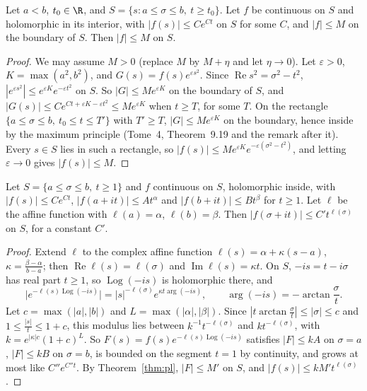 \begin{theorem}\label{thm:pl}
Let $a<b$, $t_0\in\R$, and $S=\{s:a\le\sigma\le b,\ t\ge t_0\}$. Let $f$ be continuous on $S$ and holomorphic in its interior, with $|f(s)|\le Ce^{Ct}$ on $S$ for some $C$, and $|f|\le M$ on the boundary of $S$.
Then $|f|\le M$ on $S$.
\end{theorem}
\begin{proof}
We may assume $M>0$ (replace $M$ by $M+\eta$ and let $\eta\to0$). Let $\varepsilon>0$, $K=\max(a^2,b^2)$, and $G(s)=f(s)e^{\varepsilon s^2}$. Since $\operatorname{Re}s^2=\sigma^2-t^2$, $|e^{\varepsilon s^2}|\le e^{\varepsilon K}e^{-\varepsilon t^2}$ on $S$. So
$|G|\le Me^{\varepsilon K}$ on the boundary of $S$, and $|G(s)|\le Ce^{Ct+\varepsilon K-\varepsilon t^2}\le Me^{\varepsilon K}$ when $t\ge T$, for some $T$. On the rectangle $\{a\le\sigma\le b,\ t_0\le t\le T'\}$ with $T'\ge T$,
$|G|\le Me^{\varepsilon K}$ on the boundary, hence inside by the maximum principle (Tome~4, Theorem~9.19 and the remark after it). Every $s\in S$ lies in such a rectangle, so
$|f(s)|\le Me^{\varepsilon K}e^{-\varepsilon(\sigma^2-t^2)}$, and letting $\varepsilon\to0$ gives $|f(s)|\le M$.
\end{proof}

\begin{corollary}[convexity]\label{cor:convexity}
Let $S=\{a\le\sigma\le b,\ t\ge1\}$ and $f$ continuous on $S$, holomorphic inside, with $|f(s)|\le Ce^{Ct}$, $|f(a+it)|\le At^\alpha$ and $|f(b+it)|\le Bt^\beta$ for $t\ge1$. Let $\ell$ be the affine function with
$\ell(a)=\alpha$, $\ell(b)=\beta$. Then $|f(\sigma+it)|\le C't^{\ell(\sigma)}$ on $S$, for a constant $C'$.
\end{corollary}
\begin{proof}
Extend $\ell$ to the complex affine function $\ell(s)=\alpha+\kappa(s-a)$, $\kappa=\frac{\beta-\alpha}{b-a}$; then $\operatorname{Re}\ell(s)=\ell(\sigma)$ and $\operatorname{Im}\ell(s)=\kappa t$. On $S$, $-is=t-i\sigma$ has real part
$t\ge1$, so $\operatorname{Log}(-is)$ is holomorphic there, and
\[
\bigl|e^{-\ell(s)\operatorname{Log}(-is)}\bigr|=|s|^{-\ell(\sigma)}e^{\kappa t\arg(-is)},\qquad\arg(-is)=-\arctan\frac\sigma t.
\]
Let $c=\max(|a|,|b|)$ and $L=\max(|\alpha|,|\beta|)$. Since $|t\arctan\frac\sigma t|\le|\sigma|\le c$ and $1\le\frac{|s|}t\le1+c$, this modulus lies between $k^{-1}t^{-\ell(\sigma)}$ and $kt^{-\ell(\sigma)}$, with
$k=e^{|\kappa|c}(1+c)^L$. So $F(s)=f(s)e^{-\ell(s)\operatorname{Log}(-is)}$ satisfies $|F|\le kA$ on $\sigma=a$, $|F|\le kB$ on $\sigma=b$, is bounded on the segment $t=1$ by continuity, and grows at most like
$C''e^{C''t}$. By Theorem~\ref{thm:pl}, $|F|\le M'$ on $S$, and $|f(s)|\le kM't^{\ell(\sigma)}$.
\end{proof}


